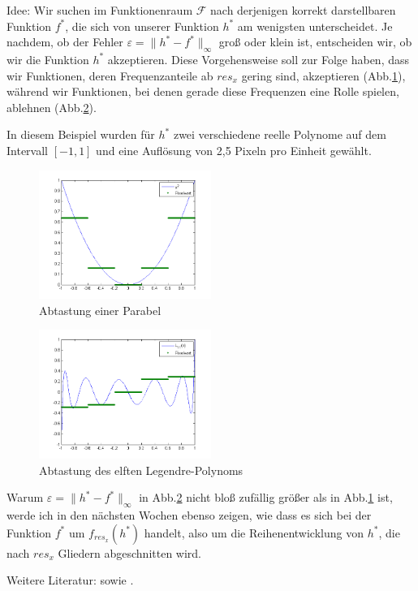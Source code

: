 \documentclass[a4paper]{article}
\begin{document}
Idee: Wir suchen im Funktionenraum $\mathcal{F}$ nach derjenigen korrekt darstellbaren Funktion $f^*$, die sich von unserer Funktion $h^*$ am wenigsten unterscheidet. Je nachdem, ob der Fehler $\varepsilon=\lVert h^*-f^*\rVert_{\infty}$ groß oder klein ist, entscheiden wir, ob wir die Funktion $h^*$ akzeptieren.
Diese Vorgehensweise soll zur Folge haben, dass wir Funktionen, deren Frequenzanteile ab $res_x$ gering sind, akzeptieren (Abb.\ref{Abb.1}), während wir Funktionen, bei denen gerade diese Frequenzen eine Rolle spielen, ablehnen (Abb.\ref{Abb.2}).

In diesem Beispiel wurden für $h^*$ zwei verschiedene reelle Polynome auf dem Intervall $[-1,1]$ und eine Auflösung von 2,5 Pixeln pro Einheit gewählt.

\begin{figure}[ht]
\centering
\includegraphics[width=0.5\textwidth]{../grafiken/parabelplot.png}
\caption{Abtastung einer Parabel}
\label{Abb.1}
\end{figure}
\begin{figure}[ht]
\centering
\includegraphics[width=0.5\textwidth]{../grafiken/legendre11plot.png}
\caption{Abtastung des elften Legendre-Polynoms}
\label{Abb.2}
\end{figure}

Warum $\varepsilon=\lVert h^*-f^*\rVert_{\infty}$ in Abb.\ref{Abb.2} nicht bloß zufällig größer als in Abb.\ref{Abb.1} ist, werde ich in den nächsten Wochen ebenso zeigen, wie dass es sich bei der Funktion $f^*$ um $f_{res_x}(h^*)$ handelt, also um die Reihenentwicklung von $h^*$, die nach $res_x$ Gliedern abgeschnitten wird.

Weitere Literatur: \cite[]{Achilles1978} sowie \cite[]{Schroeder1978}.



\end{document}
